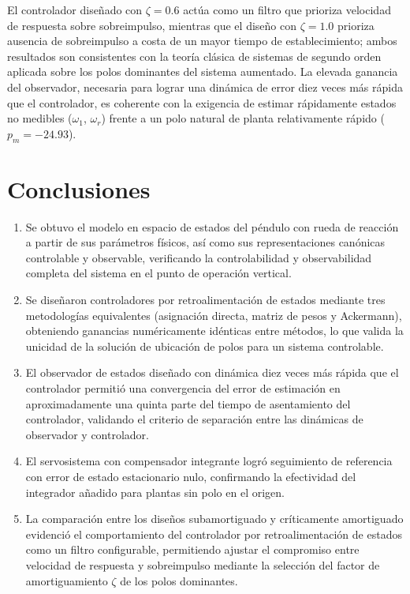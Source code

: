 \documentclass[conference]{IEEEtran}
\begin{document}
El controlador diseñado con $\zeta=0.6$ actúa como un filtro que prioriza velocidad de respuesta sobre sobreimpulso, mientras que el diseño con $\zeta=1.0$ prioriza ausencia de sobreimpulso a costa de un mayor tiempo de establecimiento; ambos resultados son consistentes con la teoría clásica de sistemas de segundo orden aplicada sobre los polos dominantes del sistema aumentado. La elevada ganancia del observador, necesaria para lograr una dinámica de error diez veces más rápida que el controlador, es coherente con la exigencia de estimar rápidamente estados no medibles ($\omega_1$, $\omega_r$) frente a un polo natural de planta relativamente rápido ($p_m=-24.93$).

\section{Conclusiones}

\begin{enumerate}
    \item Se obtuvo el modelo en espacio de estados del péndulo con rueda de reacción a partir de sus parámetros físicos, así como sus representaciones canónicas controlable y observable, verificando la controlabilidad y observabilidad completa del sistema en el punto de operación vertical.
    \item Se diseñaron controladores por retroalimentación de estados mediante tres metodologías equivalentes (asignación directa, matriz de pesos y Ackermann), obteniendo ganancias numéricamente idénticas entre métodos, lo que valida la unicidad de la solución de ubicación de polos para un sistema controlable.
    \item El observador de estados diseñado con dinámica diez veces más rápida que el controlador permitió una convergencia del error de estimación en aproximadamente una quinta parte del tiempo de asentamiento del controlador, validando el criterio de separación entre las dinámicas de observador y controlador.
    \item El servosistema con compensador integrante logró seguimiento de referencia con error de estado estacionario nulo, confirmando la efectividad del integrador añadido para plantas sin polo en el origen.
    \item La comparación entre los diseños subamortiguado y críticamente amortiguado evidenció el comportamiento del controlador por retroalimentación de estados como un filtro configurable, permitiendo ajustar el compromiso entre velocidad de respuesta y sobreimpulso mediante la selección del factor de amortiguamiento $\zeta$ de los polos dominantes.
\end{enumerate}
\end{document}
